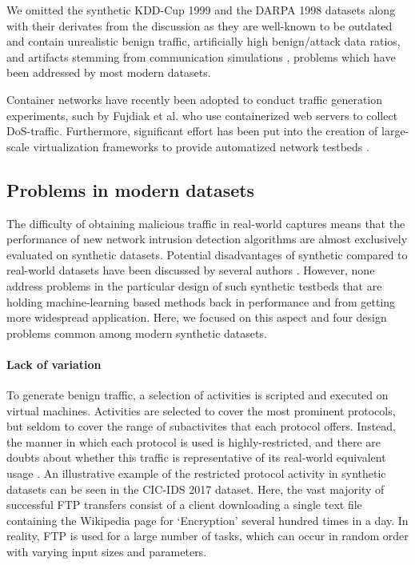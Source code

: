 We omitted the synthetic KDD-Cup 1999 and the DARPA 1998 datasets along with their derivates from the discussion as they are well-known to be outdated and contain unrealistic benign traffic, artificially high benign/attack data ratios, and artifacts stemming from communication simulations \cite{tavallaee2009detailed,mchugh2000testing}, problems which have been addressed by most modern datasets.

Container networks have recently been adopted to conduct traffic generation experiments, such by Fujdiak et al. \cite{fujdiak2018ip} who use containerized web servers to collect DoS-traffic. Furthermore, significant effort has been put into the creation of large-scale virtualization frameworks to provide automatized network testbeds \cite{crussell2015minimega, badiger2018violet}.




\subsection{Problems in modern datasets}\label{Sec:problems}

The difficulty of obtaining malicious traffic in real-world captures means that the performance of new network intrusion detection algorithms are almost exclusively evaluated on synthetic datasets. Potential disadvantages of synthetic compared to real-world datasets have been discussed by several authors \cite{sommer2010outside,sperotto2009labeled}. However, none address problems in the particular design of such synthetic testbeds that are holding machine-learning based methods back in performance and from getting more widespread application. Here, we focused on this aspect and four design problems common among modern synthetic datasets.


\paragraph{Lack of variation}\label{Sec:lackvar}

To generate benign traffic, a selection of activities is scripted and executed on virtual machines. Activities are selected to cover the most prominent protocols, but seldom to cover the range of subactivites that each protocol offers. Instead, the manner in which each protocol is used is highly-restricted, and there are doubts about whether this traffic is representative of its real-world equivalent usage \cite{sommer2010outside}. 
An illustrative example of the restricted protocol activity in synthetic datasets can be seen in the CIC-IDS 2017 dataset. Here, the vast majority of successful FTP transfers consist of a client downloading a single text file containing the Wikipedia page for `Encryption' several hundred times in a day. In reality, FTP is used for a large number of tasks, which can occur in random order with varying input sizes and parameters. 

